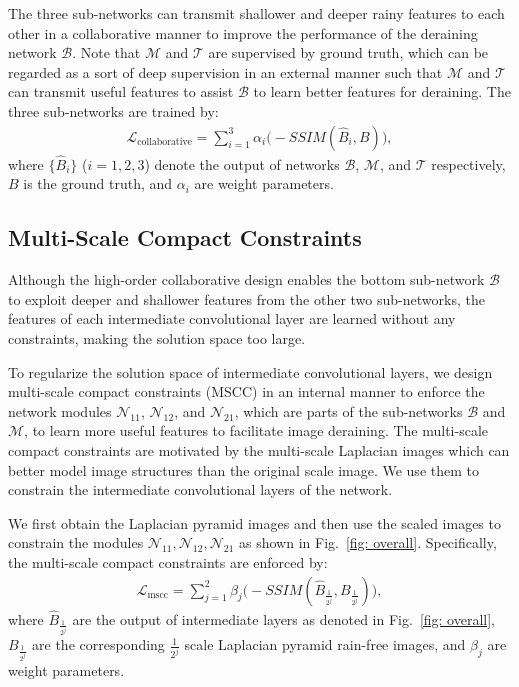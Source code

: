 \documentclass[letterpaper]{article} %
\begin{document}
The three sub-networks can transmit shallower and deeper rainy features to each other in a collaborative manner to improve the performance of the deraining network $\mathcal{B}$.
Note that $\mathcal{M}$ and $\mathcal{T}$ are supervised by ground truth, which can be regarded as a sort of deep supervision in an external manner such that $\mathcal{M}$ and $\mathcal{T}$ can transmit useful features to assist $\mathcal{B}$ to learn better features for deraining.
The three sub-networks are trained by:
\begin{equation}
\begin{array}{ll}
\mathcal{L}_{\text{collaborative}} = \sum_{i=1}^{3}\alpha_{i} \big(-SSIM(\hat{B}_{i}, B)\big),
\end{array}
\label{eq:n0}
\end{equation}
where $\{\hat{B}_{i}\}$ ($ i = 1, 2, 3$) denote the output of networks $\mathcal{B}$, $\mathcal{M}$, and $\mathcal{T}$ respectively, $B$ is the ground truth, and $\alpha_{i}$ are weight parameters.
\subsection{Multi-Scale Compact Constraints}\label{sec: Multi-scale Compact Constraint}
Although the high-order collaborative design enables the bottom sub-network $\mathcal{B}$ to exploit deeper and shallower features from the other two sub-networks, the features of each intermediate convolutional layer are learned without any constraints, making the solution space too large.

To regularize the solution space of intermediate convolutional layers, we design multi-scale compact constraints (MSCC) in an internal manner to enforce the network modules $\mathcal{N}_{11}$, $\mathcal{N}_{12}$, and $\mathcal{N}_{21}$, which are parts of the sub-networks $\mathcal{B}$ and $\mathcal{M}$, to learn more useful features to facilitate image deraining.
The multi-scale compact constraints are motivated by the multi-scale Laplacian images which can better model image structures than the original scale image. We use them to constrain the intermediate convolutional layers of the network.

We first obtain the Laplacian pyramid images and then use the scaled images to
constrain the modules $\mathcal{N}_{11}, \mathcal{N}_{12},  \mathcal{N}_{21}$ as shown in Fig.~\ref{fig: overall}. Specifically,
the multi-scale compact constraints are enforced by:
\begin{equation}
\begin{array}{ll}
\mathcal{L}_{\text{mscc}} = \sum_{j=1}^{2}\beta_{j}\big(-SSIM(\hat{B}_{\frac{1}{2^{j}}}, B_{\frac{1}{2^{j}}})\big),
\end{array}
\label{eq:n0}
\end{equation}
where $\hat{B}_{\frac{1}{2^{j}}}$ are the output of intermediate layers as denoted in Fig.~\ref{fig: overall},
$B_{\frac{1}{2^{j}}}$ are the corresponding $\frac{1}{2^{j}}$ scale Laplacian pyramid rain-free images, and
$\beta_{j}$ are weight parameters.
\end{document}
